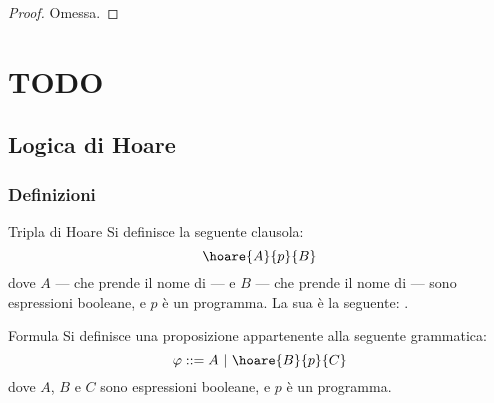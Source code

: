 \documentclass[a4paper, 12pt]{report}
\begin{document}
    \begin{proof}
        Omessa.
    \end{proof}

    \chapter{TODO}
    
    \section{Logica di Hoare}

    \subsection{Definizioni}

    \begin{frameddefn}{Tripla di Hoare}
        Si definisce  la seguente clausola: $$\hoare{A}{p}{B}$$ dove $A$ --- che prende il nome di  --- e $B$ --- che prende il nome di  --- sono espressioni booleane, e $p$ è un programma. La sua  è la seguente: .
    \end{frameddefn}

    \begin{frameddefn}[label={formula}]{Formula}
        Si definisce  una proposizione appartenente alla seguente grammatica: $$\varphi ::= A \ | \ \hoare{B}{p}{C}$$ dove $A$, $B$ e $C$ sono espressioni booleane, e $p$ è un programma.
    \end{frameddefn}
\end{document}
